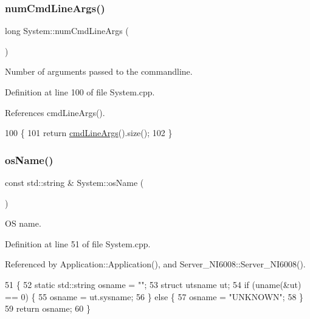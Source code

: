 \subsubsection{\texorpdfstring{num\+Cmd\+Line\+Args()}{numCmdLineArgs()}}
{\footnotesize\ttfamily long System\+::num\+Cmd\+Line\+Args (\begin{DoxyParamCaption}{ }\end{DoxyParamCaption})}



Number of arguments passed to the commandline. 



Definition at line 100 of file System.\+cpp.



References cmd\+Line\+Args().


\begin{DoxyCode}
100                               \{
101   \textcolor{keywordflow}{return} \hyperlink{namespaceSystem_ac5277fb525c07b07bbd94a61e62bc0f5}{cmdLineArgs}().size();
102 \}
\end{DoxyCode}
\mbox{\label{namespaceSystem_a08f605cda93733c3b7593517ed18557c}} 
\subsubsection{\texorpdfstring{os\+Name()}{osName()}}
{\footnotesize\ttfamily const std\+::string \& System\+::os\+Name (\begin{DoxyParamCaption}{ }\end{DoxyParamCaption})}



OS name. 



Definition at line 51 of file System.\+cpp.



Referenced by Application\+::\+Application(), and Server\+\_\+\+N\+I6008\+::\+Server\+\_\+\+N\+I6008().


\begin{DoxyCode}
51                                 \{
52   \textcolor{keyword}{static} std::string osname = \textcolor{stringliteral}{""};
53   \textcolor{keyword}{struct }utsname ut;
54   \textcolor{keywordflow}{if} (uname(&ut) == 0) \{
55     osname = ut.sysname;
56   \} \textcolor{keywordflow}{else} \{
57     osname = \textcolor{stringliteral}{"UNKNOWN"};
58   \}
59   \textcolor{keywordflow}{return} osname;
60 \}
\end{DoxyCode}
\mbox{\label{namespaceSystem_aee568b62f9bcad983dcb3f0c30631854}} 

